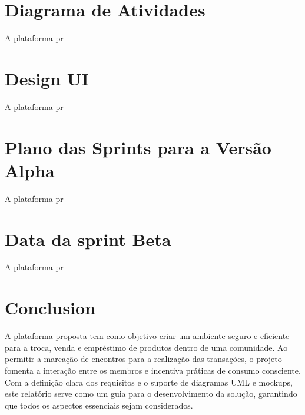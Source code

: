 \documentclass[a4paper, 12pt]{article} %
\begin{document}
\section*{Diagrama de Atividades}

A plataforma pr

\newpage
\section*{Design UI}

A plataforma pr

\newpage
\section*{Plano das Sprints para a Versão Alpha }

A plataforma pr

\newpage
\section*{Data da sprint Beta}

A plataforma pr

\newpage
\section*{Conclusion}

A plataforma proposta tem como objetivo criar um ambiente seguro e eficiente para a troca, venda e empréstimo de produtos dentro de uma comunidade. Ao permitir a marcação de encontros para a realização das transações, o projeto fomenta a interação entre os membros e incentiva práticas de consumo consciente. 
Com a definição clara dos requisitos e o suporte de diagramas UML e mockups, este relatório serve como um guia para o desenvolvimento da solução, garantindo que todos os aspectos essenciais sejam considerados.







\end{document}
